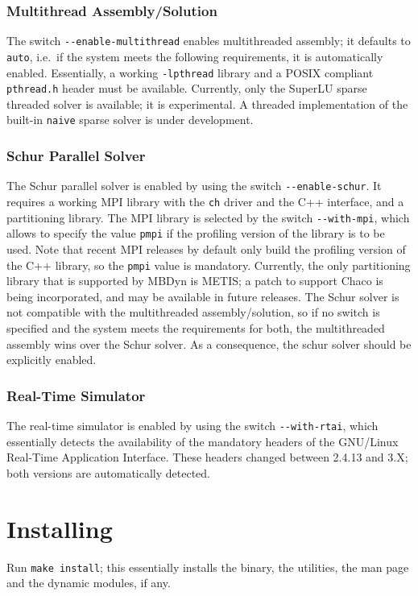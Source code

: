\documentclass[10pt,dvips]{report}
\newcommand{\kw}[1]{\texttt{#1}}
\begin{document}
\subsection{Multithread Assembly/Solution}
The switch \kw{-{}-enable-multithread} enables multithreaded assembly;
it defaults to \kw{auto}, i.e.\ if the system meets the following
requirements, it is automatically enabled.
Essentially, a working \kw{-lpthread} library and a POSIX compliant
\kw{pthread.h} header must be available.
Currently, only the SuperLU sparse threaded solver is available;
it is experimental.
A threaded implementation of the built-in \kw{naive} sparse solver
is under development.

\subsection{Schur Parallel Solver}
The Schur parallel solver is enabled by using the switch
\kw{-{}-enable-schur}.
It requires a working MPI library with the \kw{ch} driver
and the C++ interface, and a partitioning library.
The MPI library is selected by the switch \kw{-{}-with-mpi},
which allows to specify the value \kw{pmpi} if the profiling
version of the library is to be used.
Note that recent MPI releases by default only build the profiling
version of the C++ library, so the \kw{pmpi} value is mandatory.
Currently, the only partitioning library that is supported by MBDyn
is METIS; a patch to support Chaco is being incorporated,
and may be available in future releases.
The Schur solver is not compatible with the multithreaded
assembly/solution, so if no switch is specified and the system
meets the requirements for both, the multithreaded assembly wins
over the Schur solver.
As a consequence, the schur solver should be explicitly enabled.

\subsection{Real-Time Simulator}
The real-time simulator is enabled by using the switch
\kw{-{}-with-rtai}, which essentially detects the availability
of the mandatory headers of the GNU/Linux Real-Time Application
Interface.
These headers changed between 2.4.13 and 3.X; both versions
are automatically detected.

\chapter{Installing}
Run \kw{make install}; this essentially installs the binary,
the utilities, the man page and the dynamic modules, if any.
\end{document}
